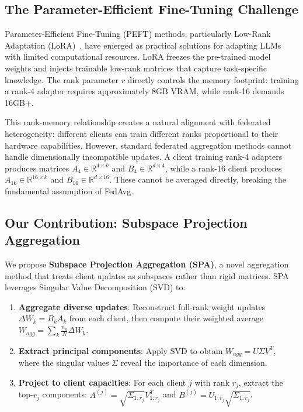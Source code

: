 \documentclass[conference]{IEEEtran}
\begin{document}
\subsection{The Parameter-Efficient Fine-Tuning Challenge}

Parameter-Efficient Fine-Tuning (PEFT) methods, particularly Low-Rank Adaptation (LoRA)~\cite{hu2021lora}, have emerged as practical solutions for adapting LLMs with limited computational resources. LoRA freezes the pre-trained model weights and injects trainable low-rank matrices that capture task-specific knowledge. The rank parameter $r$ directly controls the memory footprint: training a rank-4 adapter requires approximately 8GB VRAM, while rank-16 demands 16GB+.

This rank-memory relationship creates a natural alignment with federated heterogeneity: different clients can train different ranks proportional to their hardware capabilities. However, standard federated aggregation methods cannot handle dimensionally incompatible updates. A client training rank-4 adapters produces matrices $A_4 \in \mathbb{R}^{4 \times k}$ and $B_4 \in \mathbb{R}^{d \times 4}$, while a rank-16 client produces $A_{16} \in \mathbb{R}^{16 \times k}$ and $B_{16} \in \mathbb{R}^{d \times 16}$. These cannot be averaged directly, breaking the fundamental assumption of FedAvg.

\subsection{Our Contribution: Subspace Projection Aggregation}

We propose \textbf{Subspace Projection Aggregation (SPA)}, a novel aggregation method that treats client updates as subspaces rather than rigid matrices. SPA leverages Singular Value Decomposition (SVD) to:

\begin{enumerate}
    \item \textbf{Aggregate diverse updates}: Reconstruct full-rank weight updates $\Delta W_k = B_k A_k$ from each client, then compute their weighted average $W_{agg} = \sum_k \frac{n_k}{N} \Delta W_k$.
    
    \item \textbf{Extract principal components}: Apply SVD to obtain $W_{agg} = U \Sigma V^T$, where the singular values $\Sigma$ reveal the importance of each dimension.
    
    \item \textbf{Project to client capacities}: For each client $j$ with rank $r_j$, extract the top-$r_j$ components: $A^{(j)} = \sqrt{\Sigma_{1:r_j}} V^T_{1:r_j}$ and $B^{(j)} = U_{1:r_j} \sqrt{\Sigma_{1:r_j}}$.
\end{enumerate}
\end{document}
